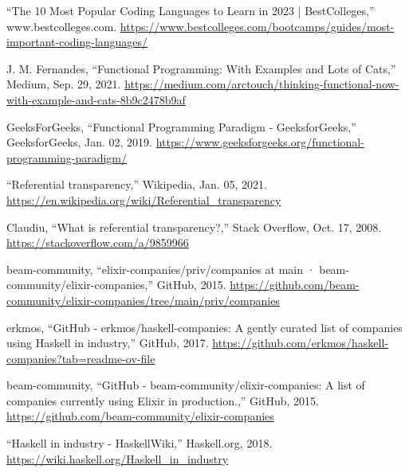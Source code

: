 \documentclass[12pt]{report} %
\begin{document}
\begin{singlespace}
\begin{thebibliography}{}
             “The 10 Most Popular Coding Languages to Learn in 2023 | BestColleges,” www.bestcolleges.com. \href{https://www.bestcolleges.com/bootcamps/guides/most-important-coding-languages/}{https://www.bestcolleges.com/bootcamps/guides/most-important-coding-languages/}

             J. M. Fernandes, “Functional Programming: With Examples and Lots of Cats,” Medium, Sep. 29, 2021. \href{https://medium.com/arctouch/thinking-functional-now-with-example-and-cats-8b9c2478b9af}{https://medium.com/arctouch/thinking-functional-now-with-example-and-cats-8b9c2478b9af}

             GeeksForGeeks, “Functional Programming Paradigm - GeeksforGeeks,” GeeksforGeeks, Jan. 02, 2019. \href{https://www.geeksforgeeks.org/functional-programming-paradigm/}{https://www.geeksforgeeks.org/functional-programming-paradigm/}

             “Referential transparency,” Wikipedia, Jan. 05, 2021. \href{https://en.wikipedia.org/wiki/Referential\_transparency}{https://en.wikipedia.org/wiki/Referential\_transparency}

             Claudiu, “What is referential transparency?,” Stack Overflow, Oct. 17, 2008. \href{https://stackoverflow.com/a/9859966}{https://stackoverflow.com/a/9859966}

             beam-community, “elixir-companies/priv/companies at main · beam-community/elixir-companies,” GitHub, 2015. \href{https://github.com/beam-community/elixir-companies/tree/main/priv/companies}{https://github.com/beam-community/elixir-companies/tree/main/priv/companies}

             erkmos, “GitHub - erkmos/haskell-companies: A gently curated list of companies using Haskell in industry,” GitHub, 2017. \href{https://github.com/erkmos/haskell-companies?tab=readme-ov-file}{https://github.com/erkmos/haskell-companies?tab=readme-ov-file}

             beam-community, “GitHub - beam-community/elixir-companies: A list of companies currently using Elixir in production.,” GitHub, 2015. \href{https://github.com/beam-community/elixir-companies}{https://github.com/beam-community/elixir-companies}

             “Haskell in industry - HaskellWiki,” Haskell.org, 2018. \href{https://wiki.haskell.org/Haskell\_in\_industry}{https://wiki.haskell.org/Haskell\_in\_industry}


\end{thebibliography}
\end{singlespace}
\end{document}
